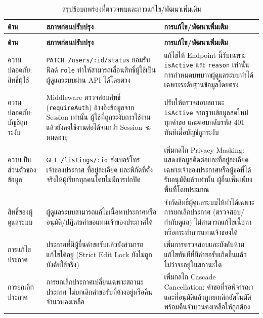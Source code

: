 \documentclass[12pt,a4paper]{report}
\begin{document}
{\small
\renewcommand{\arraystretch}{1.25}
\begin{longtable}{>{\raggedright\arraybackslash}p{2.6cm} >{\raggedright\arraybackslash}p{6.0cm} >{\raggedright\arraybackslash}p{6.0cm}}
\caption{สรุปข้อบกพร่องที่ตรวจพบและการแก้ไข/พัฒนาเพิ่มเติม}\label{tab:gap}\\
\toprule
\textbf{ด้าน} & \textbf{สภาพก่อนปรับปรุง} & \textbf{การแก้ไข/พัฒนาเพิ่มเติม}\\
\midrule
\endfirsthead
\multicolumn{3}{l}{\small\textit{(ต่อจากหน้าก่อน) ตารางที่ \thetable: สรุปข้อบกพร่องที่ตรวจพบและการแก้ไข/พัฒนาเพิ่มเติม}}\\
\toprule
\textbf{ด้าน} & \textbf{สภาพก่อนปรับปรุง} & \textbf{การแก้ไข/พัฒนาเพิ่มเติม}\\
\midrule
\endhead
\bottomrule
\endfoot
ความปลอดภัย: สิทธิ์ผู้ใช้ &
\texttt{PATCH /users/\allowbreak{}:id/\allowbreak{}status} ยอมรับฟิลด์ \texttt{role} ทำให้สามารถเลื่อนสิทธิ์ผู้ใช้เป็นผู้ดูแลระบบผ่าน API ได้โดยตรง &
แก้ไขให้ Endpoint นี้รับเฉพาะ \texttt{isActive} และ \texttt{reason} เท่านั้น การกำหนดบทบาทผู้ดูแลระบบทำได้เฉพาะระดับฐานข้อมูลโดยตรง\\
ความปลอดภัย: บัญชีถูกระงับ &
Middleware ตรวจสอบสิทธิ์ (\texttt{requireAuth}) อ้างอิงข้อมูลจาก Session เท่านั้น ผู้ใช้ที่ถูกระงับการใช้งานแล้วยังคงใช้งานต่อได้จนกว่า Session จะหมดอายุ &
ปรับให้ตรวจสอบสถานะ \texttt{isActive} จากฐานข้อมูลสดใหม่ทุกคำขอ และตอบกลับรหัส 401 ทันทีเมื่อบัญชีถูกระงับ\\
ความเป็นส่วนตัวของข้อมูล &
\texttt{GET /listings/:id} ส่งเบอร์โทรเจ้าของประกาศ ที่อยู่ละเอียด และพิกัดที่ตั้งจริงให้ผู้เรียกทุกคนโดยไม่มีการปกปิด &
เพิ่มกลไก Privacy Masking: แสดงข้อมูลติดต่อและที่อยู่ละเอียดเฉพาะเจ้าของประกาศหรือผู้ขอที่ได้รับอนุมัติแล้วเท่านั้น ผู้อื่นเห็นเพียงพื้นที่โดยประมาณ\\
สิทธิ์ของผู้ดูแลระบบ &
ผู้ดูแลระบบสามารถแก้ไขเนื้อหาประกาศหรืออนุมัติ/ปฏิเสธคำขอแทนเจ้าของประกาศได้ &
จำกัดสิทธิ์ผู้ดูแลระบบให้ทำได้เฉพาะการยกเลิกประกาศ (ตรวจสอบ/กำกับดูแล) ไม่สามารถแก้ไขเนื้อหาหรือกระทำการแทนเจ้าของได้\\
การแก้ไขประกาศ &
ประกาศที่มีผู้ยื่นคำขอรับแล้วยังสามารถแก้ไขได้อยู่ (Strict Edit Lock ยังไม่ถูกบังคับใช้จริง) &
เพิ่มการตรวจสอบและบังคับห้ามแก้ไขทันทีที่มีคำขอรับเกิดขึ้นแล้ว ไม่ว่าจะอยู่ในสถานะใด\\
การยกเลิกประกาศ &
การยกเลิกประกาศเปลี่ยนเฉพาะสถานะประกาศ ไม่ยกเลิกคำขอรับที่ค้างอยู่หรือคืนจำนวนคงเหลือ &
เพิ่มกลไก Cascade Cancellation: คำขอที่รอพิจารณาและที่อนุมัติแล้วถูกยกเลิกอัตโนมัติ พร้อมคืนจำนวนคงเหลือให้ถูกต้อง\\

\end{longtable}}
\end{document}
